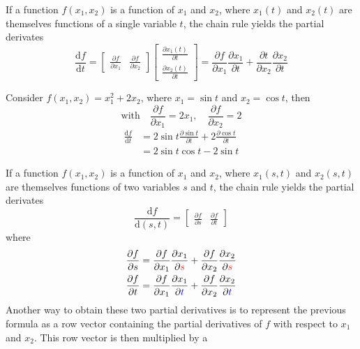 \documentclass{article}
\begin{document}
If a function $f(x_1,x_2)$ is a function of $x_1$ and $x_2$, where
$x_1(t)$ and $x_2(t)$ are themselves functions of a single variable $t$, the
chain rule yields the partial derivates
$$\frac{\text{d}f}{\text{d}t}=\begin{bmatrix}
    \frac{\partial{f}}{\partial{x_1}} & \frac{\partial{f}}{\partial{x_2}}
    \end{bmatrix}\begin{bmatrix}
    \frac{\partial{x_1(t)}}{\partial{t}} \\ 
    \frac{\partial{x_2(t)}}{\partial{t}}
\end{bmatrix}=\frac{\partial{f}}{\partial{x_1}}\frac{\partial{x_1}}{\partial{t}}+\frac{\partial{t}}{\partial{x_2}}\frac{\partial{x_2}}{\partial{t}}$$
\newpage
\begin{example}
    Consider $f(x_1,x_2)=x_1^2+2x_2$, where $x_1=\sin t$ and $x_2=\cos t$,
    then
    $$\text{with}\quad\frac{\partial{f}}{\partial{x_1}}=2x_1,\quad \frac{\partial{f}}{\partial{x_2}}=2$$
    $$\begin{aligned}
        \frac{\text{d}f}{\text{d}t}&=2\sin t \frac{\partial{\sin t}}{\partial{t}}+2 \frac{\partial{\cos
        t}}{\partial t}\\
            &=2\sin t\cos t-2\sin t
    \end{aligned}$$
\end{example}
If a function $f(x_1,x_2)$ is a function of $x_1$ and $x_2$, where $x_1(s,t)$
and $x_2(s,t)$ are themselves functions of two variables $s$ and $t$, the
chain rule yields the partial derivates
$$
\frac{\text{d}f}{\text{d}(s,t)}=\begin{bmatrix}
    \frac{\partial{f}}{\partial{s}} & \frac{\partial{f}}{\partial{t}}
\end{bmatrix} 
$$
where 
$$
\begin{aligned}
    \frac{\partial{f}}{\partial{s}}&=\frac{\partial{f}}{\partial{x_1}}\frac{\partial{x_1}}{\partial{{\color{red}s}}}+\frac{\partial{f}}{\partial{x_2}}\frac{\partial{x_2}}{\partial{{\color{red}s}}}\\
    \frac{\partial{f}}{\partial{t}}&=\frac{\partial{f}}{\partial{x_1}}\frac{\partial{x_1}}{\partial{{\color{blue}t}}}+\frac{\partial{f}}{\partial{x_2}}\frac{\partial{x_2}}{\partial{{\color{blue}t}}}\\
\end{aligned}
$$
Another way to obtain these two partial derivatives is to represent the
previous formula as a row vector containing the partial derivatives of $f$
with respect to $x_1$ and $x_2$. This row vector is then multiplied by a
\end{document}
